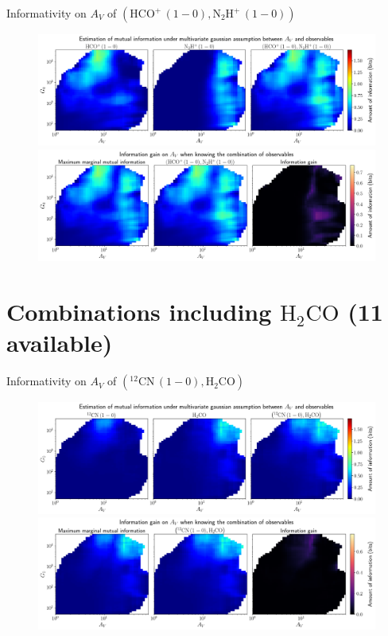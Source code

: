 \documentclass{beamer}
\begin{document}
\begin{frame}{Informativity on $A_V$ of $\left(\mathrm{HCO^+\,(1-0)},\mathrm{N_2H^+\,(1-0)}\right)$}
    \begin{figure}
        \centering
        \includegraphics[width=0.95\linewidth]{../linearinfo/av__hcop10_n2hp10_linearinfo.png}
        \vfill
        \includegraphics[width=0.95\linewidth]{../linearinfo/av__hcop10_n2hp10_linearinfo_gain.png}
    \end{figure}
\end{frame}

\section{Combinations including $\mathrm{H_2CO}$ (11 available)}

\begin{frame}{Informativity on $A_V$ of $\left(\mathrm{^{12}CN\,(1-0)},\mathrm{H_2CO}\right)$}
    \begin{figure}
        \centering
        \includegraphics[width=0.95\linewidth]{../linearinfo/av__12cn10_h2co_linearinfo.png}
        \vfill
        \includegraphics[width=0.95\linewidth]{../linearinfo/av__12cn10_h2co_linearinfo_gain.png}
    \end{figure}
\end{frame}
\end{document}

